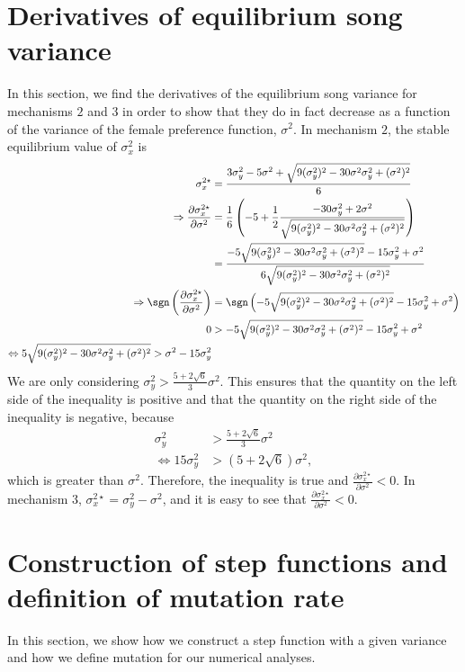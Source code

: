 \documentclass{article}
\begin{document}
\section{Derivatives of equilibrium song variance \label{sigmax2_derivatives}}
In this section, we find the derivatives of the equilibrium song variance for mechanisms $2$ and $3$ in order to show that they do in fact decrease as a function of the variance of the female preference function, $\sigma^2$. In mechanism $2$, the stable equilibrium value of $\sigma_x^2$ is 
\begin{align*}
\sigma_x^{2\star}&=\frac{3\sigma_y^2-5\sigma^2+\sqrt{9(\sigma_y^2)^2-30\sigma^2\sigma_y^2+(\sigma^2)^2}}{6}
\\ \Rightarrow \frac{\partial \sigma_x^{2\star}}{\partial \sigma^2}&=\frac{1}{6}\left(-5+\frac{1}{2}\frac{-30\sigma_y^2+2\sigma^2}{\sqrt{9(\sigma_y^2)^2-30\sigma^2\sigma_y^2+(\sigma^2)^2}}\right)
\\&=\frac{-5\sqrt{9(\sigma_y^2)^2-30\sigma^2\sigma_y^2+(\sigma^2)^2}-15\sigma_y^2+\sigma^2}{6\sqrt{9(\sigma_y^2)^2-30\sigma^2\sigma_y^2+(\sigma^2)^2}}
\\\Rightarrow \sgn\left(\frac{\partial \sigma_x^{2\star}}{\partial \sigma^2}\right)&=\sgn\left(-5\sqrt{9(\sigma_y^2)^2-30\sigma^2\sigma_y^2+(\sigma^2)^2}-15\sigma_y^2+\sigma^2\right)
\\0&>-5\sqrt{9(\sigma_y^2)^2-30\sigma^2\sigma_y^2+(\sigma^2)^2}-15\sigma_y^2+\sigma^2
\\ \Leftrightarrow 5\sqrt{9(\sigma_y^2)^2-30\sigma^2\sigma_y^2+(\sigma^2)^2}>\sigma^2-15\sigma_y^2
\end{align*}
We are only considering $\sigma_y^2>\frac{5+2\sqrt{6}}{3}\sigma^2$. This ensures that the quantity on the left side of the inequality is positive and that the quantity on the right side of the inequality is negative, because 
\begin{align*}
\sigma_y^2&>\frac{5+2\sqrt{6}}{3}\sigma^2
\\ \Leftrightarrow 15\sigma_y^2&>(5+2\sqrt{6})\sigma^2,
\end{align*}
which is greater than $\sigma^2$.
Therefore, the inequality is true and $\frac{\partial \sigma_x^{2\star}}{\partial \sigma^2}<0$. In mechanism $3$, $\sigma_x^{2\star}=\sigma_y^2-\sigma^2$, and it is easy to see that $\frac{\partial \sigma_x^{2\star}}{\partial \sigma^2}<0$.

\section{Construction of step functions and definition of mutation rate}
In this section, we show how we construct a step function with a given variance and how we define mutation for our numerical analyses. 
\end{document}
